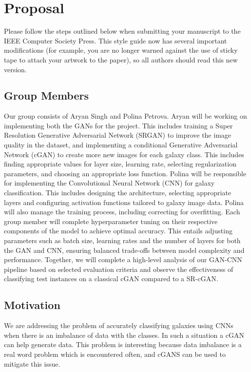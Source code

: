 \section{Proposal}
\label{sec:intro}

Please follow the steps outlined below when submitting your manuscript to the IEEE Computer Society Press.
This style guide now has several important modifications (for example, you are no longer warned against the use of sticky tape to attach your artwork to the paper), so all authors should read this new version.

\subsection{Group Members}

Our group consists of Aryan Singh and Polina Petrova. 
Aryan will be working on implementing both the GANs for the project. 
This includes training a Super Resolution Generative Adversarial Network (SRGAN) to improve the image quality in the dataset, 
and implementing a conditional Generative Adversarial Network (cGAN) to create more new images for each galaxy class. 
This includes finding appropriate values for layer size, learning rate, selecting regularization parameters, and choosing an appropriate loss function.
Polina will be responsible for implementing the Convolutional Neural Network (CNN) for galaxy classification. 
This includes designing the architecture, selecting appropriate layers and configuring activation functions tailored to galaxy image data. 
Polina will also manage the training process, including correcting for overfitting. 
Each group member will complete hyperparameter tuning on their respective components of the model to achieve optimal accuracy. 
This entails adjusting parameters such as batch size, learning rates and the number of layers for both the GAN and CNN, ensuring balanced trade-offs between model complexity and performance. 
Together, we will complete a high-level analysis of our GAN-CNN pipeline based on selected evaluation criteria and observe the effectiveness of classifying test instances on a classical cGAN compared to a SR-cGAN. 


\subsection{Motivation}

We are addressing the problem of accurately classifying galaxies using CNNs when there is an imbalance of data with the classes. 
In such a situation a cGAN can help generate data. 
This problem is interesting because data imbalance is a real word problem which is encountered often, and cGANS can be used to mitigate this issue.

